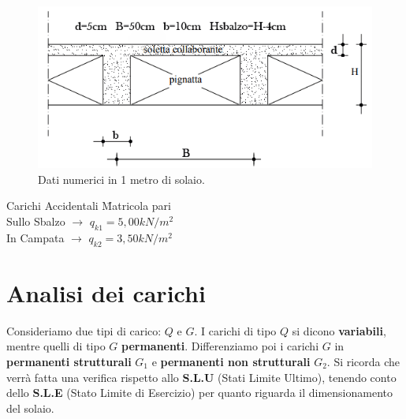 \documentclass[a4paper,12pt, oneside]{book}
\begin{document}
	\begin{figure}[H]
		\hspace*{-.4cm}
		\centering
		\includegraphics[width=0.7\linewidth]{"immagini/misure solaio flessione normale"}
		\caption{Dati numerici in 1 metro di solaio.}
		\label{fig:misure-solaio-flessione-normale}
	\end{figure}
	
	\begin{tabbing}
		Carichi Accidentali \hspace{10em} \= Matricola pari \hspace{1em} \\
		Sullo Sbalzo $\longrightarrow$    \> $q_{k1}=5,00kN/m^{2}$    \\
		In Campata   $\longrightarrow$    \> $q_{k2}=3,50kN/m^{2}$                     
	\end{tabbing}
	\chapter{Analisi dei carichi}
	
	Consideriamo due tipi di carico: $Q$ e $G$. I carichi di tipo $Q$ si dicono \textbf{variabili}, mentre quelli di tipo $G$ \textbf{permanenti}. Differenziamo poi i carichi $G$ in \textbf{permanenti strutturali} $G_1$ e \textbf{permanenti non strutturali} $G_2$.
    \leavevmode\newline
    \leavevmode\newline
	Si ricorda che verrà fatta una verifica rispetto allo \textbf{S.L.U} (Stati Limite Ultimo), tenendo conto dello \textbf{S.L.E} (Stato Limite di Esercizio) per quanto riguarda il dimensionamento del solaio.
\end{document}
